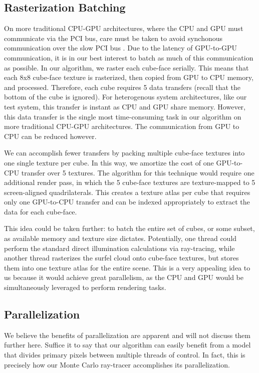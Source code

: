 \subsection{Rasterization Batching}
\label{sec:batching}
On more traditional CPU-GPU architectures, where the CPU and GPU must communicate via the PCI bus, care must be taken to avoid synchonous communication over the slow PCI bus \cite{bib:pci_press}. Due to the latency of GPU-to-GPU communication, it is in our best interest to batch as much of this communication as possible. In our algorithm, we raster each cube-face serially. This means that each 8x8 cube-face texture is rasterized, then copied from GPU to CPU memory, and processed. Therefore, each cube requires 5 data transfers (recall that the bottom of the cube is ignored). For heterogenous system architectures, like our test system, this transfer is instant as CPU and GPU share memory. However, this data transfer is the single most time-consuming task in our algorithm on more traditional CPU-GPU architectures. The communication from GPU to CPU can be reduced however.

We can accomplish fewer transfers by packing multiple cube-face textures into one single texture per cube. In this way, we amortize the cost of one GPU-to-CPU transfer over 5 textures. The algorithm for this technique would require one additional render pass, in which the 5 cube-face textures are texture-mapped to 5 screen-aligned quadrilaterals. This creates a texture atlas per cube that requires only one GPU-to-CPU transfer and can be indexed appropriately to extract the data for each cube-face.

This idea could be taken further: to batch the entire set of cubes, or some subset, as available memory and texture size dictates. Potentially, one thread could perform the standard direct illumination calculations via ray-tracing, while another thread rasterizes the surfel cloud onto cube-face textures, but stores them into one texture atlas for the entire scene. This is a very appealing idea to us because it would achieve great parallelism, as the CPU and GPU would be simultaneously leveraged to perform rendering tasks.

\subsection{Parallelization}
We believe the benefits of parallelization are apparent and will not discuss them further here. Suffice it to say that our algorithm can easily benefit from a model that divides primary pixels between multiple threads of control. In fact, this is precisely how our Monte Carlo ray-tracer accomplishes its parallelization. 

